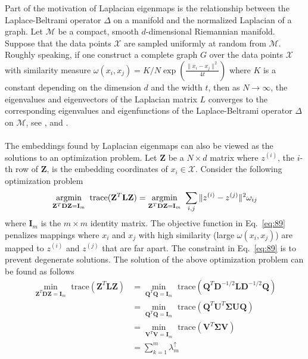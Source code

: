 Part of the motivation of Laplacian eigenmaps is the relationship
between the Laplace-Beltrami operator $\Delta$ on a manifold and the
normalized Laplacian of a graph. Let $\mathcal{M}$ be a compact,
smooth $d$-dimensional Riemannian manifold. Suppose that the data
points $\mathcal{X}$ are sampled uniformly at random from
$\mathcal{M}$. Roughly speaking, if one construct a complete graph $G$
over the data points $\mathcal{X}$ with similarity measure
$\omega(x_i,x_j) = K/N \exp{(\tfrac{\|x_i - x_j\|^2}{4t})}$ where $K$
is a constant depending on the dimension $d$ and the width $t$, then
as $N \rightarrow \infty$, the eigenvalues and eigenvectors of the
Laplacian matrix $L$ converges to the corresponding eigenvalues and
eigenfunctions of the Laplace-Beltrami operator $\Delta$ on
$\mathcal{M}$, see \citet{belkin08:_towar_theor_found_laplac}, and
\citet{belkin06:_conver_laplac_eigen}. \\ \\
%
\noindent The embeddings found by Laplacian eigenmaps can also be
viewed as the solutions to an optimization problem. Let
$\mathbf{Z}$ be a $N \times d$ matrix where $z^{(i)}$, the $i$-th
row of $\mathbf{Z}$, is the embedding coordinates of $x_i \in
\mathcal{X}$. Consider the following optimization problem
\begin{equation}
  \label{eq:89}
  \argmin_{\mathbf{Z}^{T}\mathbf{D} \mathbf{Z} = \mathbf{I}_m}{\,\,
    \mathrm{trace}(\mathbf{Z}^{T} \mathbf{L} \mathbf{Z})}
  = \argmin_{\mathbf{Z}^{T}\mathbf{D} \mathbf{Z} = \mathbf{I}_m}{\,\,
    \sum_{i,j}{ \|z^{(i)} - z^{(j)}\|^{2} \omega_{ij}}}
\end{equation}
where $\mathbf{I}_m$ is the $m \times m$ identity matrix. The
objective function in Eq.~\eqref{eq:89} penalizes mappings where $x_i$
and $x_j$ with high similarity (large $\omega(x_i,x_j)$) are mapped to
$z^{(i)}$ and $z^{(j)}$ that are far apart. The constraint in
Eq.~\eqref{eq:89} is to prevent degenerate solutions. The solution of
the above optimization problem can be found as follows
 \begin{equation}
   \label{eq:90}
   \begin{split}
     \min_{\mathbf{Z}^{T}\mathbf{D} \mathbf{Z} = \mathbf{I}_m}{\,\,
       \mathrm{trace}(\mathbf{Z}^{T} \mathbf{L} \mathbf{Z})} &=
     \min_{\mathbf{Q}^{T}\mathbf{Q} = \mathbf{I}_m}{\,\,
       \mathrm{trace}(\mathbf{Q}^{T} \mathbf{D}^{-1/2} \mathbf{L}
       \mathbf{D}^{-1/2} \mathbf{Q})} \\
     &= \min_{\mathbf{Q}^{T}\mathbf{Q} = \mathbf{I}_m}{\, \,
       \mathrm{trace}(\mathbf{Q}^{T} \mathbf{U}^{T} \bm{\Sigma}
       \mathbf{U} \mathbf{Q})} \\
     &= \min_{\mathbf{V}^{T}\mathbf{V} = \mathbf{I}_m}{\, \,
       \mathrm{trace}(\mathbf{V}^{T} \bm{\Sigma}
       \mathbf{V})} \\
     &= \sum_{k=1}^{m}{\lambda^{\uparrow}_m}
   \end{split}
 \end{equation}
